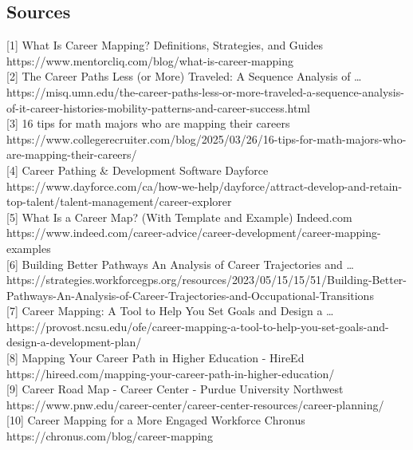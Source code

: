 \documentclass[
  letterpaper,
  DIV=11,
  numbers=noendperiod]{scrartcl}
\begin{document}
\subsection{Sources}\label{sources}

{[}1{]} What Is Career Mapping? Definitions, Strategies, and Guides
https://www.mentorcliq.com/blog/what-is-career-mapping\\
{[}2{]} The Career Paths Less (or More) Traveled: A Sequence Analysis of
\ldots{}
https://misq.umn.edu/the-career-paths-less-or-more-traveled-a-sequence-analysis-of-it-career-histories-mobility-patterns-and-career-success.html\\
{[}3{]} 16 tips for math majors who are mapping their careers
https://www.collegerecruiter.com/blog/2025/03/26/16-tips-for-math-majors-who-are-mapping-their-careers/\\
{[}4{]} Career Pathing \& Development Software \textbar{} Dayforce
https://www.dayforce.com/ca/how-we-help/dayforce/attract-develop-and-retain-top-talent/talent-management/career-explorer\\
{[}5{]} What Is a Career Map? (With Template and Example) \textbar{}
Indeed.com
https://www.indeed.com/career-advice/career-development/career-mapping-examples\\
{[}6{]} Building Better Pathways An Analysis of Career Trajectories and
\ldots{}
https://strategies.workforcegps.org/resources/2023/05/15/15/51/Building-Better-Pathways-An-Analysis-of-Career-Trajectories-and-Occupational-Transitions\\
{[}7{]} Career Mapping: A Tool to Help You Set Goals and Design a
\ldots{}
https://provost.ncsu.edu/ofe/career-mapping-a-tool-to-help-you-set-goals-and-design-a-development-plan/\\
{[}8{]} Mapping Your Career Path in Higher Education - HireEd
https://hireed.com/mapping-your-career-path-in-higher-education/\\
{[}9{]} Career Road Map - Career Center - Purdue University Northwest
https://www.pnw.edu/career-center/career-center-resources/career-planning/\\
{[}10{]} Career Mapping for a More Engaged Workforce \textbar{} Chronus
https://chronus.com/blog/career-mapping\\
\end{document}
